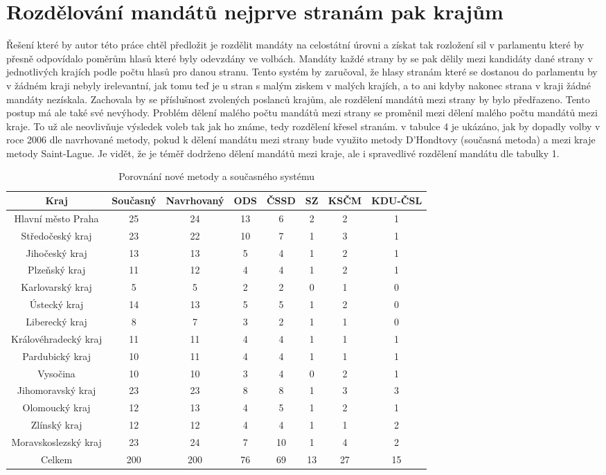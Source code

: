 \documentclass[12pt]{report}
\begin{document}
\section{Rozdělování mandátů nejprve stranám pak krajům} Řešení které by autor této práce chtěl předložit je rozdělit mandáty na celostátní úrovni a získat tak rozložení sil v parlamentu které by přesně odpovídalo poměrům hlasů které byly odevzdány ve volbách.
Mandáty každé strany by se pak dělily mezi kandidáty dané strany v jednotlivých krajích podle počtu hlasů pro danou stranu.
Tento systém by zaručoval, že hlasy stranám které se dostanou do parlamentu by v žádném kraji nebyly irelevantní, jak tomu teď je u stran s malým ziskem v malých krajích, a to ani kdyby nakonec strana v kraji žádné mandáty nezískala.
Zachovala by se příslušnost zvolených poslanců krajům, ale  rozdělení mandátů mezi strany by bylo předřazeno.
Tento postup má ale také své nevýhody.
Problém dělení malého počtu mandátů mezi strany se proměnil mezi dělení malého počtu mandátů mezi kraje.
To už ale neovlivňuje výsledek voleb tak jak ho známe, tedy rozdělení křesel stranám.
v tabulce 4 je ukázáno, jak by dopadly volby v roce 2006 dle navrhované metody, pokud k dělení mandátu mezi strany bude využito metody D'Hondtovy (současná metoda) a mezi kraje metody Saint-Lague. Je vidět, že je téměř dodrženo dělení mandátů mezi kraje, ale i spravedlivé rozdělení mandátu dle tabulky 1. 
\begin{table} \begin{tabular}{|c|c|c|c|c|c|c|c|} 
\hline Kraj & Současný & Navrhovaný & ODS & ČSSD & SZ & KSČM & KDU-ČSL \\
\hline Hlavní město Praha & 25 & 24 & 13 & 6 & 2 & 2 & 1 \\
\hline Středočeský kraj & 23 & 22 & 10 & 7 & 1 & 3 & 1 \\
\hline Jihočeský kraj & 13 & 13 & 5 & 4 & 1 & 2 & 1 \\
\hline Plzeňský kraj & 11 & 12 & 4 & 4 & 1 & 2 & 1 \\
\hline Karlovarský kraj & 5 & 5 & 2 & 2 & 0 & 1 & 0 \\
\hline Ústecký kraj & 14 & 13 & 5 & 5 & 1 & 2 & 0 \\
\hline Liberecký kraj & 8 & 7 & 3 & 2 & 1 & 1 & 0 \\
\hline Královéhradecký kraj & 11 & 11 & 4 & 4 & 1 & 1 & 1 \\
\hline Pardubický kraj & 10 & 11 & 4 & 4 & 1 & 1 & 1 \\
\hline Vysočina & 10 & 10 & 3 & 4 & 0 & 2 & 1 \\
\hline Jihomoravský kraj & 23 & 23 & 8 & 8 & 1 & 3 & 3 \\
\hline Olomoucký kraj & 12 & 13 & 4 & 5 & 1 & 2 & 1 \\
\hline Zlínský kraj & 12 & 12 & 4 & 4 & 1 & 1 & 2 \\
\hline Moravskoslezský kraj & 23 & 24 & 7 & 10 & 1 & 4 & 2 \\
\hline Celkem & 200 & 200 & 76 & 69 & 13 & 27 & 15 \\
\hline \end{tabular} \caption{Porovnání nové metody a současného systému} \end{table}
\end{document}
